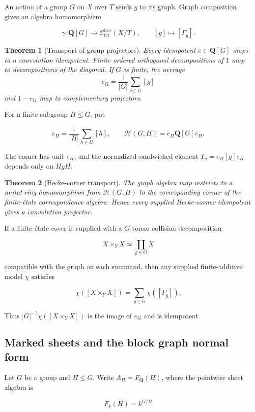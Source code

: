 \documentclass[11pt]{article}
\newtheorem{theorem}{Theorem}[section]
\theoremstyle{definition}
\theoremstyle{remark}
\newcommand{\Q}{\mathbf Q}
\newcommand{\fe}{\mathrm{f\acute et}}
\begin{document}
An action of a group \(G\) on \(X\) over \(T\) sends \(g\) to its graph.
Graph composition gives an algebra homomorphism

\[
  \gamma:\Q[G]\longrightarrow
  \mathcal C^{\mathrm{free}}_{\fe}(X/T),
  \qquad [g]\longmapsto[\Gamma_g].
\]

\begin{theorem}[Transport of group projectors]
\label{thm:group-transport}
Every idempotent \(e\in\Q[G]\) maps to a convolution idempotent.  Finite
ordered orthogonal decompositions of \(1\) map to decompositions of the
diagonal.  If \(G\) is finite, the average
\[
  e_G=\frac1{|G|}\sum_{g\in G}[g]
\]
and \(1-e_G\) map to complementary projectors.
\end{theorem}

For a finite subgroup \(H\leq G\), put

\[
  e_H=\frac1{|H|}\sum_{h\in H}[h],
  \qquad
  \mathcal H(G,H)=e_H\Q[G]e_H.
\]

The corner has unit \(e_H\), and the normalized sandwiched element
\(T_g=e_H[g]e_H\) depends only on \(HgH\).

\begin{theorem}[Hecke-corner transport]
\label{thm:hecke-transport}
The graph algebra map restricts to a unital ring homomorphism from
\(\mathcal H(G,H)\) to the corresponding corner of the finite-\'etale
correspondence algebra.  Hence every supplied Hecke-corner idempotent gives a
convolution projector.
\end{theorem}

If a finite-\'etale cover is supplied with a \(G\)-torsor collision
decomposition

\[
  X\times_YX\simeq\coprod_{g\in G}X
\]

compatible with the graph on each summand, then any supplied finite-additive
model \(\chi\) satisfies

\[
  \chi([X\times_YX])=\sum_{g\in G}\chi([\Gamma_g]).
\]

Thus \(|G|^{-1}\chi([X\times_YX])\) is the image of \(e_G\) and is
idempotent.


\subsection{Marked sheets and the block graph normal form}
\label{sec:block}

Let \(G\) be a group and \(H\leq G\).  Write \(A_H=F_{\Q}(H)\), where the
pointwise sheet algebra is

\[
  F_k(H)=k^{G/H}
\]
\end{document}

